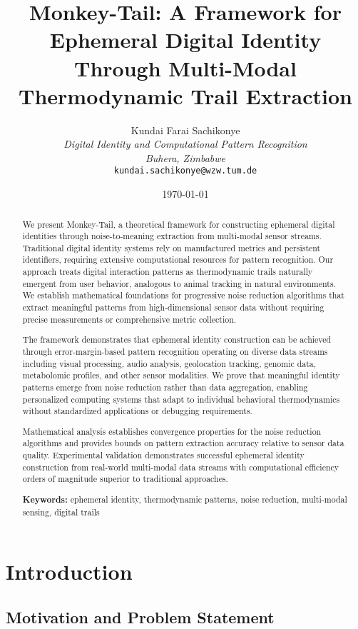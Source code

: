 \documentclass[12pt,a4paper]{article}
\title{\textbf{Monkey-Tail: A Framework for Ephemeral Digital Identity Through Multi-Modal Thermodynamic Trail Extraction}}
\author{
Kundai Farai Sachikonye\\
\textit{Digital Identity and Computational Pattern Recognition}\\
\textit{Buhera, Zimbabwe}\\
\texttt{kundai.sachikonye@wzw.tum.de}
}
\date{\today}
\begin{document}
\maketitle

\begin{abstract}
We present Monkey-Tail, a theoretical framework for constructing ephemeral digital identities through noise-to-meaning extraction from multi-modal sensor streams. Traditional digital identity systems rely on manufactured metrics and persistent identifiers, requiring extensive computational resources for pattern recognition. Our approach treats digital interaction patterns as thermodynamic trails naturally emergent from user behavior, analogous to animal tracking in natural environments. We establish mathematical foundations for progressive noise reduction algorithms that extract meaningful patterns from high-dimensional sensor data without requiring precise measurements or comprehensive metric collection.

The framework demonstrates that ephemeral identity construction can be achieved through error-margin-based pattern recognition operating on diverse data streams including visual processing, audio analysis, geolocation tracking, genomic data, metabolomic profiles, and other sensor modalities. We prove that meaningful identity patterns emerge from noise reduction rather than data aggregation, enabling personalized computing systems that adapt to individual behavioral thermodynamics without standardized applications or debugging requirements.

Mathematical analysis establishes convergence properties for the noise reduction algorithms and provides bounds on pattern extraction accuracy relative to sensor data quality. Experimental validation demonstrates successful ephemeral identity construction from real-world multi-modal data streams with computational efficiency orders of magnitude superior to traditional approaches.

\textbf{Keywords:} ephemeral identity, thermodynamic patterns, noise reduction, multi-modal sensing, digital trails
\end{abstract}

\section{Introduction}

\subsection{Motivation and Problem Statement}
\end{document}
